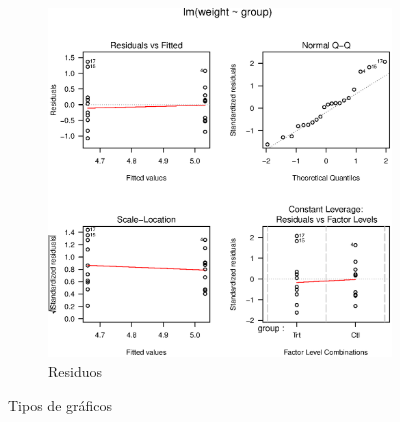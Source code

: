 \documentclass[12pt,a4paper]{article}
\begin{document}
\begin{figure}[h]
\begin{subfigure}[b]{0.3 \textwidth}
\label{fig:hist}
\end{subfigure}
~
\begin{subfigure}[b]{0.3 \textwidth} \includegraphics[width=\textwidth]{residuos} \caption{Residuos}
\label{fig:resid}
\end{subfigure}
\caption{Tipos de gráficos}
\label{fig:graf}
\end{figure}
\end{document}
